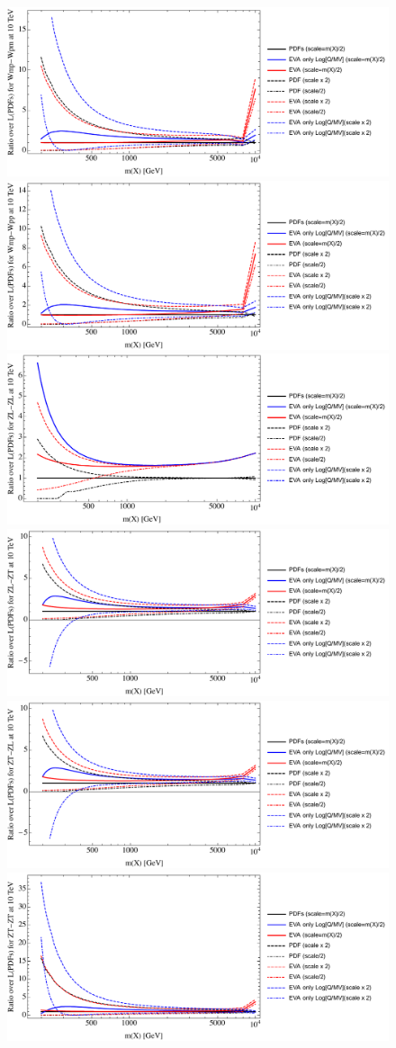 \documentclass[a4paper,11pt]{article}
\begin{document}
\begin{figure}[ht]
\includegraphics[width=0.4\linewidth]{PlotLumi/10TeV/ratios/Wmp-Wpm.pdf}
\includegraphics[width=0.4\linewidth]{PlotLumi/10TeV/ratios/Wmp-Wpp.pdf}
\includegraphics[width=0.4\linewidth]{PlotLumi/10TeV/ratios/ZL-ZL.pdf}
\includegraphics[width=0.4\linewidth]{PlotLumi/10TeV/ratios/ZL-ZT.pdf}
\includegraphics[width=0.4\linewidth]{PlotLumi/10TeV/ratios/ZT-ZL.pdf}
\includegraphics[width=0.4\linewidth]{PlotLumi/10TeV/ratios/ZT-ZT.pdf}
\end{figure}
\end{document}
